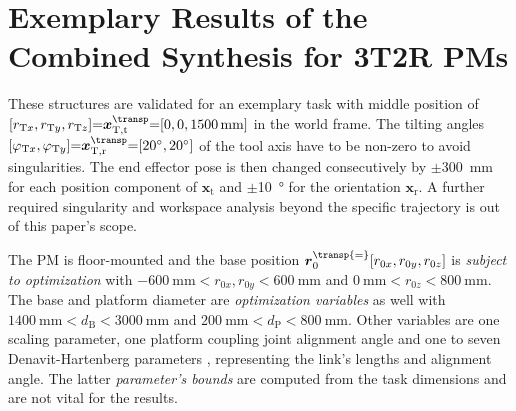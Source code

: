 \documentclass[
	graybox,
	vecphys] %
	{svmult}
\newcommand{\bm}[1]{\boldsymbol{#1}}
\begin{document}
\vspace{-0.2cm}
\section{Exemplary Results of the Combined Synthesis for 3T2R PMs}
\vspace{-0.1cm}
\label{sec:results}

These structures are validated for an exemplary task with middle position of $[r_{\mathrm{T}x},r_{\mathrm{T}y},r_{\mathrm{T}z}]{=}\bm{x}^\transp_\mathrm{T,t}{=}[0,0,\SI{1500}{\milli\metre}]$ in the world frame.
%
%
The tilting angles $[\varphi_{\mathrm{T}x},\varphi_{\mathrm{T}y}]{=}\\\bm{x}^\transp_\mathrm{T,r}{=}[\SI{20}{\degree},\SI{20}{\degree}]$ of the tool axis have to be non-zero to avoid singularities.
The end effector pose is then changed consecutively by $\pm$\SI{300}{\milli\metre} for each position component of $\bm{x}_\mathrm{t}$ and $\pm$\SI{10}{\degree} for the orientation $\bm{x}_\mathrm{r}$. %
A further required singularity \cite{MasoulehGos2011} and workspace \cite{MasoulehSaaGosTag2010} analysis beyond the specific trajectory is out of this paper's scope. %

The PM is floor-mounted and the base position $\bm{r}_0^\transp{=}[r_{0x},r_{0y},r_{0z}]$ is \emph{subject to optimization} with  $\SI{-600}{\milli\metre}{<}r_{0x},r_{0y}{<}\SI{600}{\milli\metre}$ and $\SI{0}{\milli\metre}{<}r_{0z}{<}\SI{800}{\milli\metre}$.
The base and platform diameter are \emph{optimization variables} as well  with $\SI{1400}{\milli\metre}{<}d_\mathrm{B}{<}\SI{3000}{\milli\metre}$ and $\SI{200}{\milli\metre}{<}d_\mathrm{P}{<}\SI{800}{\milli\metre}$.
Other variables are one scaling parameter, one platform coupling joint alignment angle and one to seven Denavit-Hartenberg parameters \cite{BriotKha2015}, representing the link's lengths and alignment angle.
The latter \emph{parameter's bounds} are computed from the task dimensions and are not vital for the results.
\end{document}
